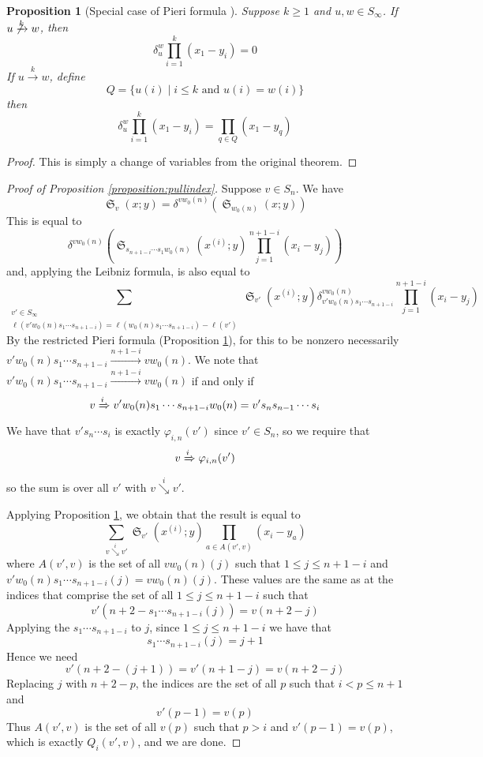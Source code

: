 \documentclass{amsart}
\newtheorem{proposition2}{Proposition}[section]
\theoremstyle{definition}
\theoremstyle{remark}
\numberwithin{equation}{subsection}
\DeclareMathOperator{\sch}{\mathfrak{S}}
\newcommand{\downvar}[1]{\stackrel{#1}{\searrow}}
\newcommand{\tom}[1]{\xrightarrow{#1}}
\newcommand{\Tom}[1]{\xRightarrow{#1}}
\newcommand{\ddv}[1]{\delta}
\begin{document}
\begin{proposition2}[Special case of Pieri formula {\cite[Theorem~7.1]{samuelmolev}}] \label{proposition:pieri}
Suppose $k\geq 1$ and $u,w\in S_\infty$. If $u\not\tom{k} w$, then
$$\ddv{y}_u^w\prod_{i=1}^k(x_1 - y_i)=0$$
If $u\tom{k} w$, define
$$Q = \{u(i)\mid i\leq k\mbox{ and }u(i)=w(i)\}$$
then
$$\ddv{y}_u^w\prod_{i=1}^k(x_1 - y_i)=\prod_{q\in Q}(x_1 - y_q)$$
\end{proposition2}
\begin{proof}
	This is simply a change of variables from the original theorem.
\end{proof}

\begin{proof}[Proof of Proposition \ref{proposition:pullindex}]
Suppose $v\in S_n$. We have
$$\sch_v(x;y)=\ddv{y}^{vw_0(n)}(\sch_{w_0(n)}(x;y))$$
This is equal to
$$\ddv{y}^{vw_0(n)}\left(\sch_{s_{n+1-i}\cdots s_1w_0(n)}(x^{(i)};y)\prod_{j=1}^{n+1-i}(x_i - y_j)\right)$$
and, applying the Leibniz formula, is also equal to
$$\sum_{\substack{v'\in S_\infty\\\ell(v'w_0(n)s_1\cdots s_{n+1-i})=\ell(w_0(n)s_1\cdots s_{n+1-i})-\ell(v')}}\sch_{v'}(x^{(i)};y)\ddv{y}_{v'w_0(n)s_1\cdots s_{n+1-i}}^{vw_0(n)}\prod_{j=1}^{n+1-i}(x_i - y_j)$$
By the restricted Pieri formula (Proposition \ref{proposition:pieri}), for this to be nonzero necessarily $v'w_0(n)s_1\cdots s_{n+1-i}\tom{n+1-i}vw_0(n)$. We note that $v'w_0(n)s_1\cdots s_{n+1-i}\tom{n+1-i}vw_0(n)$ if and only if 
$$v\Tom{i}v'w_0(n)s_1\cdots s_{n+1-i}w_0(n)=v's_ns_{n-1}\cdots s_i$$
We have that $v's_n\cdots s_i$ is exactly $\varphi_{i,n}(v')$ since $v'\in S_n$, so we require that
$$v\Tom{i}\varphi_{i,n}(v')$$
so the sum is over all $v'$ with $v\downvar{i} v'$.

Applying Proposition \ref{proposition:pieri}, we obtain that the result is equal to
$$\sum_{v\downvar{i} v'} \sch_{v'}(x^{(i)};y)\prod_{a\in A(v',v)}(x_i - y_a)$$
where $A(v',v)$ is the set of all $vw_0(n)(j)$ such that $1\leq j\leq n+1-i$ and $v'w_0(n)s_1\cdots s_{n+1-i}(j)=vw_0(n)(j)$. These values are the same as at the indices that comprise the set of all $1\leq j\leq n+1-i$ such that
$$v'(n+2-s_1\cdots s_{n+1-i}(j))=v(n+2-j)$$
Applying the $s_1\cdots s_{n+1-i}$ to $j$, since $1\leq j\leq n+1-i$ we have that 
$$s_1\cdots s_{n+1-i}(j)=j+1$$
Hence we need
$$v'(n+2-(j+1))=v'(n+1-j)=v(n+2-j)$$
Replacing $j$ with $n+2-p$, the indices are the set of all $p$ such that $i<p\leq n+1$ and
$$v'(p-1)=v(p)$$
Thus $A(v',v)$ is the set of all $v(p)$ such that $p>i$ and $v'(p-1)=v(p)$, which is exactly $Q_i(v',v)$, and we are done.
\end{proof}





\end{document}

